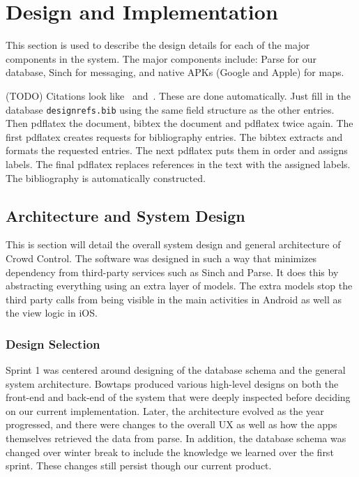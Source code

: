 

\chapter{Design  and Implementation}
This section is used to describe the design details for each of the major components 
in the system.   The major components include: Parse for our database, Sinch for messaging, 
and native APKs (Google and Apple) for maps.   

(TODO) Citations look like~\cite{Choset:2005:PRM, arkin2009governing, lavalle2006}  and~\cite{wiki:asimo,lumelsky:1987, nolfi2000evolutionary}.  These are done automatically.  Just fill in the database {\tt designrefs.bib} using the same field structure as the other entries.  Then pdflatex the document, bibtex the document and pdflatex twice again.  The first pdflatex creates requests for bibliography entries.
The bibtex extracts and formats the requested entries.  The next pdflatex puts them in order and assigns labels.  The final pdflatex replaces references in the text with the assigned labels.
The bibliography is automatically constructed.  
 
 \section{Architecture and System Design}
 This is section will detail the overall system design and general architecture of Crowd Control. The software was designed in such a way that minimizes dependency from third-party services such as Sinch and Parse.  It does this by abstracting everything using an extra layer of models.  The extra models stop the third party calls from being visible in the main activities in Android as well as the view logic in iOS.
 
 \subsection{Design Selection}
Sprint 1 was centered around designing of the database schema and the general system architecture. Bowtaps produced various high-level designs on both the front-end and back-end of the system that were deeply inspected before deciding on our current implementation. Later, the architecture evolved as the year progressed, and there were changes to the overall UX as well as how the apps themselves retrieved the data from parse. In addition, the database schema was changed over winter break to include the knowledge we learned over the first sprint. These changes still persist though our current product.

